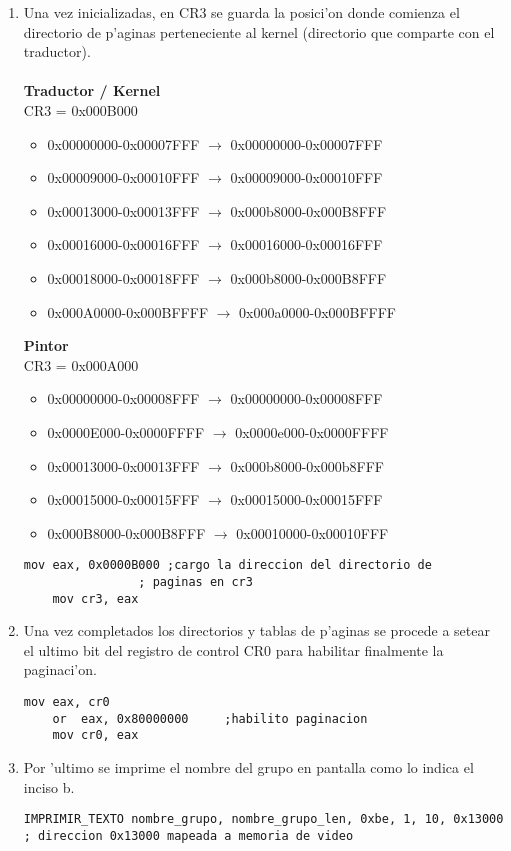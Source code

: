 \documentclass[11pt]{article}
\begin{document}
\begin{enumerate}
\item Una vez inicializadas, en CR3 se guarda la posici'on donde comienza el directorio de p'aginas perteneciente al kernel (directorio que comparte con el traductor).\\
\\
\textbf{Traductor / Kernel} \\
	CR3 = 0x000B000 \\
\begin{itemize}
\item 0x00000000-0x00007FFF	$\rightarrow$ 0x00000000-0x00007FFF 
\item 0x00009000-0x00010FFF	$\rightarrow$ 0x00009000-0x00010FFF 
\item 0x00013000-0x00013FFF	$\rightarrow$ 0x000b8000-0x000B8FFF 
\item 0x00016000-0x00016FFF	$\rightarrow$ 0x00016000-0x00016FFF 
\item 0x00018000-0x00018FFF	$\rightarrow$ 0x000b8000-0x000B8FFF 
\item 0x000A0000-0x000BFFFF	$\rightarrow$ 0x000a0000-0x000BFFFF 
\end{itemize}
\textbf{Pintor} \\
	CR3 = 0x000A000 \\
\begin{itemize}
\item 0x00000000-0x00008FFF 	$\rightarrow$ 0x00000000-0x00008FFF 
\item 0x0000E000-0x0000FFFF	$\rightarrow$ 0x0000e000-0x0000FFFF 
\item 0x00013000-0x00013FFF	$\rightarrow$ 0x000b8000-0x000b8FFF 
\item 0x00015000-0x00015FFF	$\rightarrow$ 0x00015000-0x00015FFF 
\item 0x000B8000-0x000B8FFF	$\rightarrow$ 0x00010000-0x00010FFF 
\end{itemize}
\begin{lstlisting}[frame=single]
	mov eax, 0x0000B000	;cargo la direccion del directorio de
				; paginas en cr3
	mov cr3, eax
\end{lstlisting}

\item
Una vez completados los directorios y tablas de p'aginas se procede a setear el ultimo bit del registro de control CR0 para habilitar finalmente la paginaci'on.
\begin{lstlisting}[frame=single]
	mov eax, cr0				
	or  eax, 0x80000000		;habilito paginacion
	mov cr0, eax
\end{lstlisting}

\item
Por 'ultimo se imprime el nombre del grupo en pantalla como lo indica el inciso b.
\begin{lstlisting}[frame=single]
IMPRIMIR_TEXTO nombre_grupo, nombre_grupo_len, 0xbe, 1, 10, 0x13000
; direccion 0x13000 mapeada a memoria de video
\end{lstlisting}

\end{enumerate}
\end{document}
